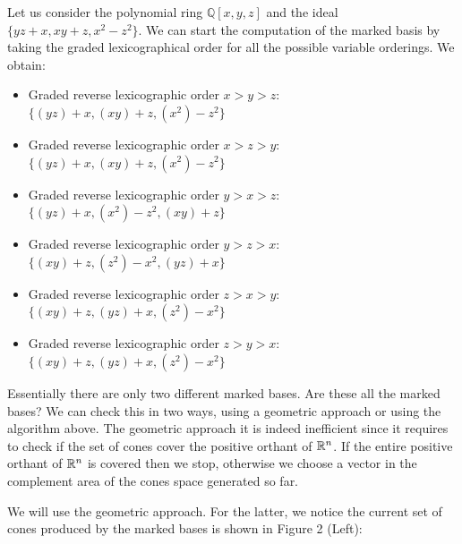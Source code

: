 \begin{example}
  Let us consider the polynomial ring $\mathbb{Q}[x, y, z]$ and
  the ideal $\{yz + x, xy + z, x^2 -z^2\}$. We can start the computation
  of the marked \grob basis by taking the graded lexicographical order for
  all the possible variable orderings. We obtain:

  \begin{itemize}
  \item Graded reverse lexicographic order $x > y > z$: $\{(yz)+x, (xy)+z, (x^2)-z^2\}$
  \item Graded reverse lexicographic order $x > z > y$: $\{(yz)+x, (xy)+z, (x^2)-z^2\}$
  \item Graded reverse lexicographic order $y > x > z$: $\{(yz)+x, (x^2)-z^2, (xy)+z\}$
  \item Graded reverse lexicographic order $y > z > x$: $\{(xy)+z, (z^2)-x^2, (yz)+x\}$
  \item Graded reverse lexicographic order $z > x > y$: $\{(xy)+z, (yz)+x, (z^2)-x^2\}$
  \item Graded reverse lexicographic order $z > y > x$: $\{(xy)+z, (yz)+x, (z^2)-x^2\}$
  \end{itemize}

  Essentially there are only two different marked \grob bases. Are these all the marked \grob bases?
  We can check this in two ways, using a geometric approach or using the algorithm above. The
  geometric approach it is indeed inefficient since it requires to check if the set of cones
  cover the positive orthant of $\mathbb{R}^n$. If the entire positive orthant of $\mathbb{R}^n$ is covered
  then we stop, otherwise we choose a vector in the complement area of the cones space generated so far.

  We will use the geometric approach. For the latter, we notice the current set of cones produced
  by the marked \grob bases is shown in Figure 2 (Left):


\end{example}
